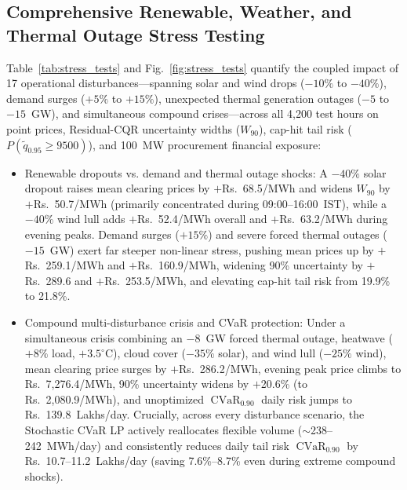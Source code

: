 \documentclass[journal,10pt,twocolumn]{IEEEtran}
\begin{document}
\subsection{Comprehensive Renewable, Weather, and Thermal Outage Stress Testing}
Table~\ref{tab:stress_tests} and Fig.~\ref{fig:stress_tests} quantify the coupled impact of 17 operational disturbances---spanning solar and wind drops ($-10\%$ to $-40\%$), demand surges ($+5\%$ to $+15\%$), unexpected thermal generation outages ($-5$ to $-15$~GW), and simultaneous compound crises---across all 4,200 test hours on point prices, Residual-CQR uncertainty widths ($W_{90}$), cap-hit tail risk ($P(\tilde{q}_{0.95} \ge 9500)$), and 100~MW procurement financial exposure:
\begin{itemize}
    \item Renewable dropouts vs. demand and thermal outage shocks: A $-40\%$ solar dropout raises mean clearing prices by $+$Rs.~68.5/MWh and widens $W_{90}$ by $+$Rs.~50.7/MWh (primarily concentrated during 09:00--16:00~IST), while a $-40\%$ wind lull adds $+$Rs.~52.4/MWh overall and $+$Rs.~63.2/MWh during evening peaks. Demand surges ($+15\%$) and severe forced thermal outages ($-15$~GW) exert far steeper non-linear stress, pushing mean prices up by $+$Rs.~259.1/MWh and $+$Rs.~160.9/MWh, widening 90\% uncertainty by $+$Rs.~289.6 and $+$Rs.~253.5/MWh, and elevating cap-hit tail risk from 19.9\% to 21.8\%.
    \item Compound multi-disturbance crisis and CVaR protection: Under a simultaneous crisis combining an $-8$~GW forced thermal outage, heatwave ($+8\%$ load, $+3.5^\circ\text{C}$), cloud cover ($-35\%$ solar), and wind lull ($-25\%$ wind), mean clearing price surges by $+$Rs.~286.2/MWh, evening peak price climbs to Rs.~7,276.4/MWh, 90\% uncertainty widens by $+$20.6\% (to Rs.~2,080.9/MWh), and unoptimized $\operatorname{CVaR}_{0.90}$ daily risk jumps to Rs.~139.8~Lakhs/day. Crucially, across every disturbance scenario, the Stochastic CVaR LP actively reallocates flexible volume ($\sim$238--242~MWh/day) and consistently reduces daily tail risk $\operatorname{CVaR}_{0.90}$ by Rs.~10.7--11.2~Lakhs/day (saving 7.6\%--8.7\% even during extreme compound shocks).
\end{itemize}
\end{document}
